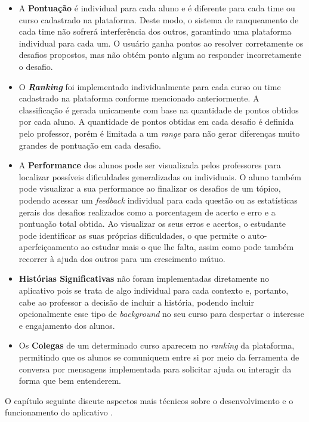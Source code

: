 \begin{itemize}
    \item A \textbf{Pontuação} é individual para cada aluno e é diferente para cada time ou curso cadastrado na plataforma. Deste modo, o sistema de ranqueamento de cada time não sofrerá interferência dos outros, garantindo uma plataforma individual para cada um. O usuário ganha pontos ao resolver corretamente os desafios propostos, mas não obtém ponto algum ao responder incorretamente o desafio.
    \item O \textbf{\textit{Ranking}} foi implementado individualmente para cada curso ou time cadastrado na plataforma conforme mencionado anteriormente. A classificação é gerada unicamente com base na quantidade de pontos obtidos por cada aluno. A quantidade de pontos obtidas em cada desafio é definida pelo professor, porém é limitada a um \textit{range} para não gerar diferenças muito grandes de pontuação em cada desafio.
    \item A \textbf{Performance} dos alunos pode ser visualizada pelos professores para localizar possíveis dificuldades generalizadas ou individuais. O aluno também pode visualizar a sua performance ao finalizar os desafios de um tópico, podendo acessar um \textit{feedback} individual para cada questão ou as estatísticas gerais dos desafios realizados como a porcentagem de acerto e erro e a pontuação total obtida. Ao visualizar os seus erros e acertos, o estudante pode identificar as suas próprias dificuldades, o que permite o auto-aperfeiçoamento ao estudar mais o que lhe falta, assim como pode também recorrer à ajuda dos outros para um crescimento mútuo.
    \item \textbf{Histórias Significativas} não foram implementadas diretamente no aplicativo pois se trata de algo individual para cada contexto e, portanto, cabe ao professor a decisão de incluir a história, podendo incluir opcionalmente esse tipo de \textit{background} no seu curso para despertar o interesse e engajamento dos alunos.
    \item Os \textbf{Colegas} de um determinado curso aparecem no \textit{ranking} da plataforma, permitindo que os alunos se comuniquem entre si por meio da ferramenta de conversa por mensagens implementada para solicitar ajuda ou interagir da forma que bem entenderem.
\end{itemize}

O capítulo seguinte discute aspectos mais técnicos sobre o desenvolvimento e o funcionamento do aplicativo \appName.
